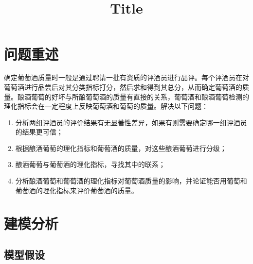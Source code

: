 \documentclass{cumcmart}
\begin{document}


\title{Title}

\maketitle

\begin{cnabstract}%


\end{cnabstract}

\newpage


\section{问题重述}
确定葡萄酒质量时一般是通过聘请一批有资质的评酒员进行品评。每个评酒员在对葡萄酒进行品尝后对其分类指标打分，然后求和得到其总分，从而确定葡萄酒的质量。酿酒葡萄的好坏与所酿葡萄酒的质量有直接的关系，葡萄酒和酿酒葡萄检测的理化指标会在一定程度上反映葡萄酒和葡萄的质量。解决以下问题：

    \begin{enumerate}
        \item 分析两组评酒员的评价结果有无显著性差异，如果有则需要确定哪一组评酒员的结果更可信；
        \item 根据酿酒葡萄的理化指标和葡萄酒的质量，对这些酿酒葡萄进行分级；
        \item 酿酒葡萄与葡萄酒的理化指标，寻找其中的联系；
        \item 分析酿酒葡萄和葡萄酒的理化指标对葡萄酒质量的影响，并论证能否用葡萄和葡萄酒的理化指标来评价葡萄酒的质量。
    \end{enumerate}

\section{建模分析}

    \subsection{模型假设}
\end{document}
